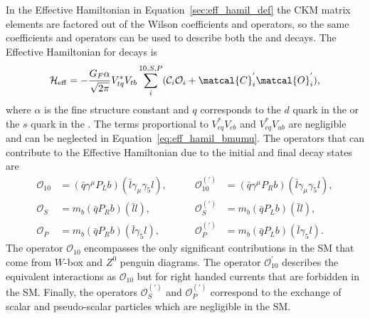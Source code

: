 {{%
In the Effective Hamiltonian in Equation~\ref{sec:eff_hamil_def} the CKM matrix elements are factored out of the Wilson coefficients and operators, so the same coefficients and operators can be used to describe both the \bd and \bs decays.
The Effective Hamiltonian for \bmumu decays is~\cite{DeBruyn:2012wk}
\begin{equation}
\mathcal{H}_{\mathrm{eff}} = -\frac{G_F \alpha}{\sqrt{2\pi}} V_{tq}^{*}V_{tb} \displaystyle\sum_{i}^{10,S,P} (\mathcal{C}_i\mathcal{O}_i + \matcal{C}^{'}_{i}\matcal{O}_{i}^{'}),
\label{eq:eff_hamil_bmumu}
\end{equation}
where $\alpha$ is the fine structure constant and $q$ corresponds to the $d$ quark in the \bd or the $s$ quark in the \bs. The terms proportional to $V^*_{cq}V_{cb}$ and $V^*_{cq}V_{ub}$ are negligible and can be neglected in Equation~\ref{eq:eff_hamil_bmumu}. The operators that can contribute to the \bmumu Effective Hamiltonian due to the initial and final decay states are
\begin{align}
 \mathcal{O}_{10}&=(\bar{q}\gamma^{\mu}P_{L}b)(\bar{l}\gamma_{\mu}\gamma_{5}l), &\qquad
 \mathcal{O}_{10}^{(')}&= (\bar{q}\gamma^{\mu}P_{R}b)(\bar{l}\gamma_{\mu}\gamma_{5}l), \\
 \mathcal{O}_{S}&= m_{b}(\bar{q}P_{R}b)(\bar{l}l),  &\qquad
\mathcal{O}_{S}^{(')}&= m_{b}(\bar{q}P_{L}b)(\bar{l}l), \\
 \mathcal{O}_{P}&= m_{b}(\bar{q}P_{R}b)(\bar{l}\gamma_{5}l), &\qquad
 \mathcal{O}_{P}^{(')}&= m_{b}(\bar{q}P_{L}b)(\bar{l}\gamma_{5}l).
\end{align}
The operator $\mathcal{O}_{10}$ encompasses the only significant contributions in the SM that come from $W$-box and $Z^0$ penguin diagrams. The operator $\mathcal{O}_{10}^'$ describes the equivalent interactions as $\mathcal{O}_{10}$ but for right handed currents that are forbidden in the SM. %
 Finally, the operators $\mathcal{O}_{S}^{(')}$ and $\mathcal{O}_{P}^{(')}$ correspond to the exchange of scalar and pseudo-scalar particles which are negligible in the SM. 

}}
